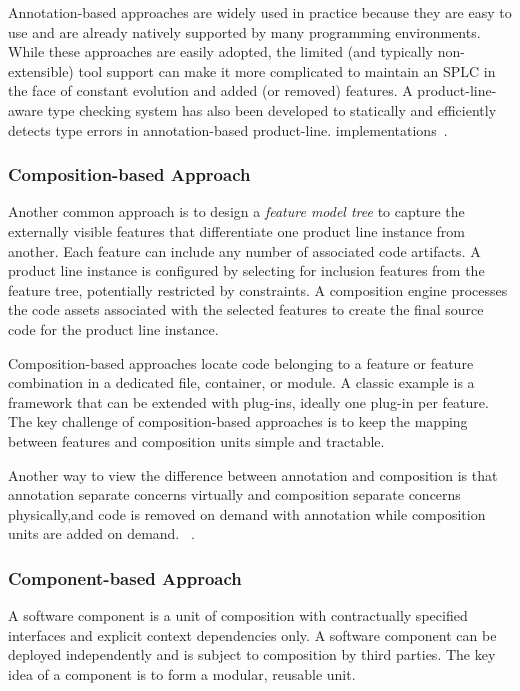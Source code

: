 Annotation-based approaches are widely used in practice because they are
easy to use and are already natively supported by many programming
environments. While these approaches are easily adopted, the limited
(and typically non-extensible) tool support can make it more complicated
to maintain an SPLC in the face of constant evolution and added (or
removed) features. A product-line-aware type checking
system has also been developed to statically and efficiently detects
type errors in annotation-based product-line.
implementations~\cite{Kastner:2012,Apel:2013:FSP:2541773}.

\subsubsection{Composition-based Approach}

Another common approach is to design a \textit{feature model tree} to capture the
externally visible features that differentiate one product line instance
from another. Each feature can include any number of associated code
artifacts. A product line instance is configured by selecting
for inclusion features from the feature tree, potentially restricted by
constraints. A composition engine processes the code assets associated
with the selected features to create the final source code for the
product line instance.

Composition-based approaches locate code belonging to a feature or
feature combination in a dedicated file, container, or module. A classic
example is a framework that can be extended with plug-ins, ideally one
plug-in per feature. The key challenge of composition-based approaches
is to keep the mapping between features and composition units simple and
tractable.

Another way to view the difference between annotation and composition is
that annotation separate concerns virtually and composition separate
concerns physically,and code is removed on demand with annotation while
composition units are added on demand.
~\cite{Thum:2014:FEF:2537169.2537315,Apel:2013:FSP:2541773}.

\subsubsection{Component-based Approach}

A software component is a unit of composition with contractually
specified interfaces and explicit context dependencies only. A software
component can be deployed independently and is subject to composition by
third parties. The key idea of a component is to form a modular,
reusable unit.

